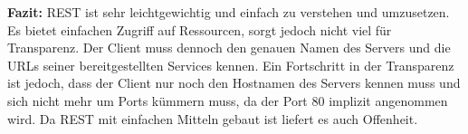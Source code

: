\textbf{Fazit:}
REST ist sehr leichtgewichtig und einfach zu verstehen und umzusetzen. Es bietet einfachen Zugriff auf Ressourcen, sorgt jedoch nicht viel für Transparenz. Der Client muss dennoch den genauen Namen des Servers und die URLs seiner bereitgestellten Services kennen. Ein Fortschritt in der Transparenz ist jedoch, dass der Client nur noch den Hostnamen des Servers kennen muss und sich nicht mehr um Ports kümmern muss, da der Port 80 implizit angenommen wird. Da REST mit einfachen Mitteln gebaut ist liefert es auch Offenheit.